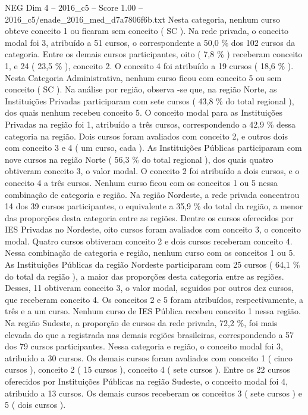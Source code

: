 \begin{textsample}{NEG Dim 4 – 2016\_c5 – Score 1.00 – 2016\_c5/enade\_2016\_med\_d7a7806f6b.txt}
Nesta categoria, nenhum curso obteve conceito 1 ou ficaram sem conceito ( SC ).
Na rede privada, o conceito modal foi 3, atribuído a 51 cursos, o correspondente a 50,0 \% dos 102 cursos da categoria.
Entre os demais cursos participantes, oito ( 7,8 \% ) receberam conceito 1, e 24 ( 23,5 \% ), conceito 2.
O conceito 4 foi atribuído a 19 cursos ( 18,6 \% ).
Nesta Categoria Administrativa, nenhum curso ficou com conceito 5 ou sem conceito ( SC ).
Na análise por região, observa -se que, na região Norte, as Instituições Privadas participaram com sete cursos ( 43,8 \% do total regional ), dos quais nenhum recebeu conceito 5.
O conceito modal para as Instituições Privadas na região foi 1, atribuído a três cursos, correspondendo a 42,9 \% dessa categoria na região.
Dois cursos foram avaliados com conceito 2, e outros dois com conceito 3 e 4 ( um curso, cada ).
As Instituições Públicas participaram com nove cursos na região Norte ( 56,3 \% do total regional ), dos quais quatro obtiveram conceito 3, o valor modal.
O conceito 2 foi atribuído a dois cursos, e o conceito 4 a três cursos.
Nenhum curso ficou com os conceitos 1 ou 5 nessa combinação de categoria e região.
Na região Nordeste, a rede privada concentrou 14 dos 39 cursos participantes, o equivalente a 35,9 \% do total da região, a menor das proporções desta categoria entre as regiões.
Dentre os cursos oferecidos por IES Privadas no Nordeste, oito cursos foram avaliados com conceito 3, o conceito modal.
Quatro cursos obtiveram conceito 2 e dois cursos receberam conceito 4.
Nessa combinação de categoria e região, nenhum curso com os conceitos 1 ou 5.
As Instituições Públicas da região Nordeste participaram com 25 cursos ( 64,1 \% do total da região ), a maior das proporções desta categoria entre as regiões.
Desses, 11 obtiveram conceito 3, o valor modal, seguidos por outros dez cursos, que receberam conceito 4.
Os conceitos 2 e 5 foram atribuídos, respectivamente, a três e a um curso.
Nenhum curso de IES Pública recebeu conceito 1 nessa região.
Na região Sudeste, a proporção de cursos da rede privada, 72,2 \%, foi mais elevada do que a registrada nas demais regiões brasileiras, correspondendo a 57 dos 79 cursos participantes.
Nessa categoria e região, o conceito modal foi 3, atribuído a 30 cursos.
Os demais cursos foram avaliados com conceito 1 ( cinco cursos ), conceito 2 ( 15 cursos ), conceito 4 ( sete cursos ).
Entre os 22 cursos oferecidos por Instituições Públicas na região Sudeste, o conceito modal foi 4, atribuído a 13 cursos.
Os demais cursos receberam os conceitos 3 ( sete cursos ) e 5 ( dois cursos ).

\end{textsample}
